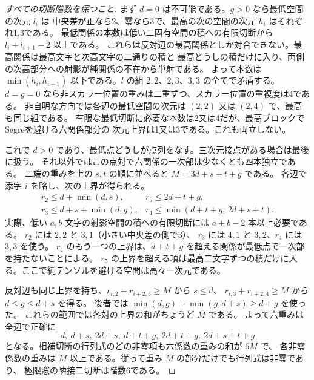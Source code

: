 \begin{proof}[すべての切断階数を保つこと]
まず $d=0$ は不可能である。$g>0$ なら最低空間の次元 $l_i$ は
中央差が正なら2、零なら3で、最高の次の空間の次元 $h_i$ はそれぞれ1,3である。
最低関係の本数は低い二固有空間の積への有限切断から $l_i+l_{i+1}-2$ 以上である。
これらは反対辺の最高関係としか対合できない。最高関係は最高文字と次高文字の二通りの積と
最高どうしの積だけに入り、両側の次高部分への射影が純関係の不在から単射である。
よって本数は $\min(h_i,h_{i+1})$ 以下である。$l$ の組 $2,2$、$2,3$、$3,3$ の全てで矛盾する。
$d=g=0$ なら非スカラー位置の重みは二重ずつ、スカラー位置の重複度は4である。
非自明な方向では各辺の最低空間の次元は $(2,2)$ 又は $(2,4)$ で、最高も同じ組である。
有限な最低切断に必要な本数は2又は4だが、最高ブロックでSegreを避ける六関係部分の
次元上界は1又は3である。これも両立しない。

これで $d>0$ であり、最低点どうしが点列をなす。三次元接点がある場合は最後に扱う。
それ以外ではこの点対で六関係の一次部は少なくとも四本独立である。
二端の重みを上の $s,t$ の順に並べると $M=3d+s+t+g$ である。
各辺で添字 $i$ を略し、次の上界が得られる。
\[
\begin{array}{ll}
 r_2\le d+\min(d,s), & r_5\le 2d+t+g,\\
 r_3\le d+s+\min(d,g), & r_4\le\min(d+t+g,\,2d+s+t).
\end{array}
\]
実際、低い $a,b$ 文字の射影空間の積への有限切断には $a+b-2$ 本以上必要である。
$r_2$ には $2,2$ と $3,1$（小さい中央差の側で3）、
$r_3$ には $4,1$ と $3,2$、$r_4$ には $3,3$ を使う。
$r_4$ のもう一つの上界は、$d+t+g$ を超える関係が最低点で一次部を持たないことによる。
$r_5$ の上界を超える項は最高二文字ずつの積だけに入る。ここで純テンソルを避ける空間は高々一次元である。

反対辺も同じ上界を持ち、$r_{i,2}+r_{i+2,5}\ge M$ から $s\le d$、
$r_{i,3}+r_{i+2,4}\ge M$ から $d\le g\le d+s$ を得る。
後者では $\min(d,g)+\min(g,d+s)\ge d+g$ を使った。
これらの範囲では各対の上界の和がちょうど $M$ である。
よって六重みは全辺で正確に
\[
 d,\ d+s,\ 2d+s,\ d+t+g,\ 2d+t+g,\ 2d+s+t+g
\]
となる。相補切断の行列式のどの非零項も六係数の重みの和が $6M$ で、
各非零係数の重みは $M$ 以上である。従って重み $M$ の部分だけでも行列式は非零であり、
極限窓の隣接二切断は階数6である。
\end{proof}

